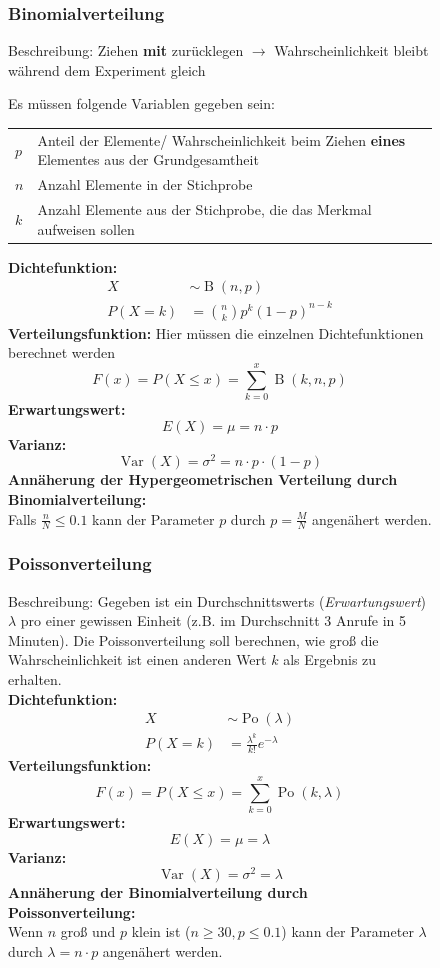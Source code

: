 \documentclass[twoside, a4paper]{report}
\begin{document}
\begin{figure}[H]
  \subsubsection{Binomialverteilung}
Beschreibung: Ziehen \textbf{mit} zurücklegen $\rightarrow$ Wahrscheinlichkeit bleibt während dem Experiment gleich

  Es müssen folgende Variablen gegeben sein:

  \begin{tabularx}{\textwidth}{lX}
    \toprule
    \(p\) & Anteil der Elemente/ Wahrscheinlichkeit beim Ziehen \textbf{eines} Elementes aus der Grundgesamtheit\\
    \(n\) & Anzahl Elemente in der Stichprobe\\
    \(k\) & Anzahl Elemente aus der Stichprobe, die das Merkmal aufweisen sollen\\
    \bottomrule
  \end{tabularx}

  \textbf{Dichtefunktion:}
  \begin{align*}
    X &\sim \operatorname{B}(n,p)\\[1em]
    P(X = k) &= \binom{n}{k}p^k{(1 - p)}^{n-k}
  \end{align*}
  \textbf{Verteilungsfunktion:}
  Hier müssen die einzelnen Dichtefunktionen berechnet werden
  \[F(x) = P(X \leq x) = \sum_{k=0}^x\operatorname{B}(k,n,p)\]
  \textbf{Erwartungswert:}
  \[E(X) = \mu = n \cdot p\]
  \textbf{Varianz:}
  \[\operatorname{Var}(X) = \sigma^2 = n \cdot p \cdot (1 - p)\]
  \textbf{Annäherung der Hypergeometrischen Verteilung durch Binomialverteilung:}\\
  Falls \(\frac{n}{N} \leq 0.1\) kann der Parameter \(p\) durch \(p = \frac{M}{N}\) angenähert werden.
\end{figure}

\begin{figure}[H]
  \subsubsection{Poissonverteilung}
  Beschreibung: Gegeben ist ein Durchschnittswerts (\textit{Erwartungswert}) \(\lambda\) pro einer gewissen Einheit (z.B. im Durchschnitt 3 Anrufe in 5 Minuten). Die Poissonverteilung soll berechnen, wie groß die Wahrscheinlichkeit ist einen anderen Wert \(k\) als Ergebnis zu erhalten.\\
  \textbf{Dichtefunktion:}
  \begin{align*}
    X & \sim \operatorname{Po}(\lambda)\\[1em]
    P(X = k) & = \frac{\lambda^k}{k!}e^{-\lambda}
  \end{align*}
  \textbf{Verteilungsfunktion:}
  \[F(x) = P(X \leq x) = \sum_{k=0}^x\operatorname{Po}(k,\lambda)\]
  \textbf{Erwartungswert:}
  \[E(X) = \mu = \lambda\]
  \textbf{Varianz:}
  \[\operatorname{Var}(X) = \sigma^2 = \lambda\]
  \textbf{Annäherung der Binomialverteilung durch Poissonverteilung:}\\
  Wenn \(n\) groß und \(p\) klein ist (\(n \geq 30, p \leq 0.1\)) kann der Parameter \(\lambda\) durch \(\lambda = n \cdot p\) angenähert werden.
\end{figure}
\end{document}
